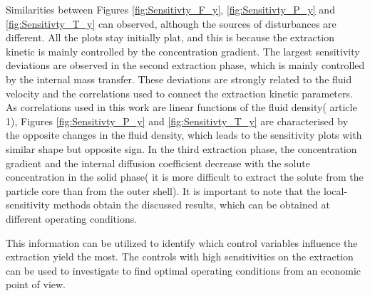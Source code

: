 \documentclass[a4paper,fleqn]{cas-dc}
\begin{document}
Similarities between Figures \ref{fig:Sensitivty_F_y}, \ref{fig:Sensitivty_P_y} and \ref{fig:Sensitivty_T_y} can observed, although the sources of disturbances are different. All the plots stay initially plat, and this is because the extraction kinetic is mainly controlled by the concentration gradient. The largest sensitivity deviations are observed in the second extraction phase, which is mainly controlled by the internal mass transfer. These deviations are strongly related to the fluid velocity and the correlations used to connect the extraction kinetic parameters. As correlations used in this work are linear functions of the fluid density( {\color{red} article 1}), Figures \ref{fig:Sensitivty_P_y} and \ref{fig:Sensitivty_T_y} are characterised by the opposite changes in the fluid density, which leads to the sensitivity plots with similar shape but opposite sign. In the third extraction phase, the concentration gradient and the internal diffusion coefficient decrease with the solute concentration in the solid phase( it is more difficult to extract the solute from the particle core than from the outer shell). It is important to note that the local-sensitivity methods obtain the discussed results, which can be obtained at different operating conditions.

This information can be utilized to identify which control variables influence the extraction yield the most. The controls with high sensitivities on the extraction can be used to investigate to find optimal operating conditions from an economic point of view.

\clearpage
%



%

%
\end{document}
